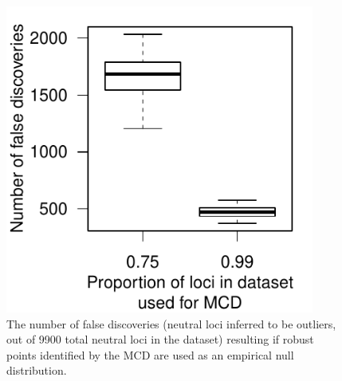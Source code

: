 \documentclass[12pt, oneside]{amsart}
\begin{document}
\newpage
\begin{figure}[h]
\begin{center}
\includegraphics[width=4in]{../figures_man2/S5-LandsharcFalsePositivesMCD.pdf}
\end{center}
\caption[]{The number of false discoveries (neutral loci inferred to be outliers, out of 9900 total neutral loci in the dataset) resulting if robust points identified by the MCD are used as an empirical null distribution.} 
 \label{fig:???}
\end{figure}
\end{document}
